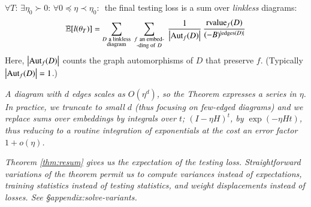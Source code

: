 {            \begin{thm} \label{thm:resum}
                $\forall T:\, \exists \eta_0 \succ 0:\,
                \forall 0\preceq \eta \prec \eta_0:\,$
                the final testing loss is
                a sum over \emph{linkless} diagrams: 
                    \squash
                \begin{equation*} \label{eq:resum}
                    \expc[l(\theta_T)]=
                    \sum_{\substack{D~\text{a linkless} \\ \text{diagram}}}
                    ~
                    \sum_{\substack{f~\text{an embed-} \\ \text{-ding of}~D}}
                    ~
                    \frac{1}{\wabs{\Aut_f(D)}}
                    \,
                    \frac{{\rvalue_f}(D)}{(-B)^{|\edges(D)|}}
                    \squash
                \end{equation*}
                Here, $\left|\text{\textnormal{Aut}}_f(D)\right|$ counts the graph automorphisms of $D$
                that preserve $f$. (Typically $\left|\text{\textnormal{Aut}}_f(D)\right|=1$.)%
            \end{thm}
            \begin{rmk} \label{rmk:integrate}
                \emph{
                A diagram with $d$ edges scales as
                $O(\eta^d)$, so the Theorem expresses a series in $\eta$.  In
                practice, we truncate to small $d$ (thus focusing on few-edged
                diagrams) and we replace sums over embeddings by integrals over
                $t$; $(I-\eta H)^t$, by $\exp(- \eta H t)$, thus reducing to a
                routine integration of exponentials at the cost an error factor
                $1 + o(\eta)$.}\mend
                \squash
            \end{rmk}
            \begin{rmk}
                \emph{Theorem \ref{thm:resum} gives us the expectation of 
                the testing loss.  Straightforward variations of the theorem permit us
                to compute variances instead of expectations, training
                statistics instead of testing statistics, and weight
                displacements instead of losses.  See \S{appendix:solve-variants}.}\mend
                \squash
            \end{rmk}
}
